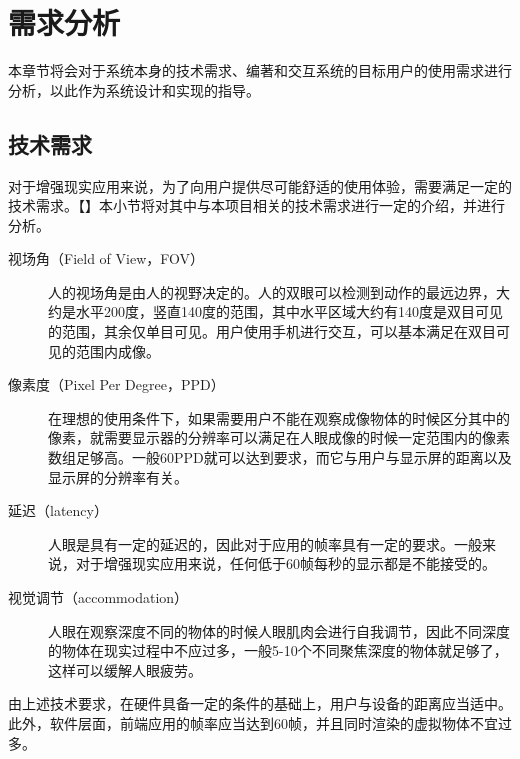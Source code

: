 \chapter{需求分析}
\label{requirement}

本章节将会对于系统本身的技术需求、编著和交互系统的目标用户的使用需求进行分析，以此作为系统设计和实现的指导。

\section{技术需求}
对于增强现实应用来说，为了向用户提供尽可能舒适的使用体验，需要满足一定的技术需求。【】本小节将对其中与本项目相关的技术需求\cite{artech}进行一定的介绍，并进行分析。

\begin{description}
    \item[视场角（Field of View，FOV）] 	人的视场角是由人的视野决定的。人的双眼可以检测到动作的最远边界，大约是水平200度，竖直140度的范围，其中水平区域大约有140度是双目可见的范围，其余仅单目可见。用户使用手机进行交互，可以基本满足在双目可见的范围内成像。
    
    \item[像素度（Pixel Per Degree，PPD）] 	在理想的使用条件下，如果需要用户不能在观察成像物体的时候区分其中的像素，就需要显示器的分辨率可以满足在人眼成像的时候一定范围内的像素数组足够高。一般60PPD就可以达到要求，而它与用户与显示屏的距离以及显示屏的分辨率有关。
    
    \item[延迟（latency）] 	人眼是具有一定的延迟的，因此对于应用的帧率具有一定的要求。一般来说，对于增强现实应用来说，任何低于60帧每秒的显示都是不能接受的。
    
    \item[视觉调节（accommodation）] 		人眼在观察深度不同的物体的时候人眼肌肉会进行自我调节，因此不同深度的物体在现实过程中不应过多，一般5-10个不同聚焦深度的物体就足够了，这样可以缓解人眼疲劳。
\end{description}

	由上述技术要求，在硬件具备一定的条件的基础上，用户与设备的距离应当适中。此外，软件层面，前端应用的帧率应当达到60帧，并且同时渲染的虚拟物体不宜过多。
